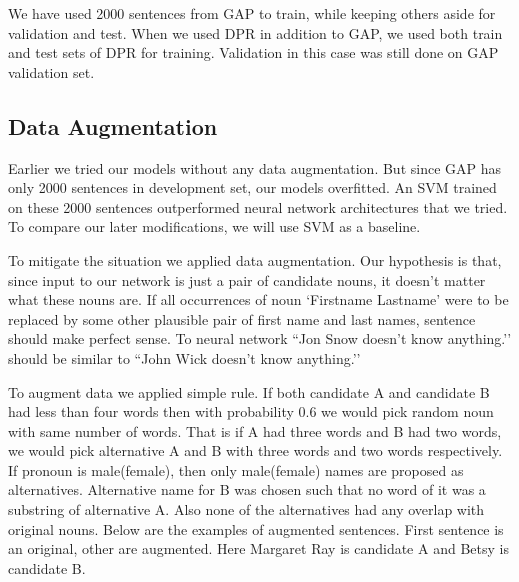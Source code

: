 \documentclass[11pt,a4paper]{article}
\begin{document}
We have used 2000 sentences from GAP to train, while keeping others aside for validation and test. When we used DPR in addition to GAP, we used both train and test sets of DPR for training. Validation in this case was still done on GAP validation set.

\subsection{Data Augmentation}
\label{subsec:augment}

Earlier we tried our models without any data augmentation. But since GAP has only 2000 sentences in development set, our models overfitted. An SVM trained on these 2000 sentences outperformed neural network architectures that we tried. To compare our later modifications, we will use SVM as a baseline.

To mitigate the situation we applied data augmentation. Our hypothesis is that, since input to our network is just a pair of candidate nouns, it doesn’t matter what these nouns are. If all occurrences of noun `Firstname Lastname’ were to be replaced by some other plausible pair of first name and last names, sentence should make perfect sense. To neural network ``Jon Snow doesn’t know anything.’’ should be similar to ``John Wick doesn’t know anything.’’ 

To augment data we applied simple rule. If both candidate A and candidate B had less than four words then with probability 0.6 we would pick random noun with same number of words. That is if A had three words and B had two words, we would pick alternative A and B with three words and two words respectively. If pronoun is male(female), then only male(female) names are proposed as alternatives. Alternative name for B was chosen such that no word of it was a substring of alternative A. Also none of the alternatives had any overlap with original nouns. Below are the examples of augmented sentences. First sentence is an original, other are augmented. Here Margaret Ray is candidate A and Betsy is candidate B.
\end{document}
